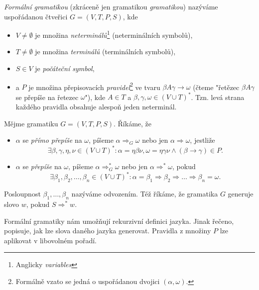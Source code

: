 \begin{definition}\label{def:formalni-gramatika}
    \emph{Formální gramatikou} (zkráceně jen gramatikou \emph{gramatikou}) nazýváme uspořádanou čtveřici $G=(V,T,P,S)$, kde
    \begin{itemize}
        \item $V\neq\emptyset$ je množina \emph{neterminálů}\footnote{Anglicky \emph{variables}} (neterminálních symbolů),
        \item $T\neq\emptyset$ je množina \emph{terminálů} (terminálních symbolů),
        \item $S\in V$ je \emph{počáteční symbol},
        \item a $P$ je množina přepisovacích \emph{pravidel}\footnote{Formálně vzato se jedná o uspořádanou dvojici $(\alpha,\omega)$.} ve tvaru $\beta A\gamma\to\omega$ (čteme "řetězec $\beta A\gamma$ se přepíše na řetezec $\omega$"), kde $A\in T$ a $\beta,\gamma,\omega\in(V\cup T)^*$. Tzn. levá strana každého pravidla obsahuje alespoň jeden neterminál.
    \end{itemize}
\end{definition}
\begin{definition}\label{def:odvozeni-slova-v-gramatice}
    Mějme gramatiku $G=(V,T,P,S)$. Říkáme, že
    \begin{itemize}
        \item $\alpha$ se \emph{přímo přepíše} na $\omega$, píšeme $\alpha\Rightarrow_G\omega$ nebo jen $\alpha\Rightarrow\omega$, jestliže
        \[\exists\beta,\gamma,\eta,\nu\in(V\cup T)^*: \alpha=\eta\beta\nu,\omega=\eta\gamma\nu\land(\beta\to\gamma)\in P.\]
        \item $\alpha$ se \emph{přepíše} na $\omega$, píšeme $\alpha\Rightarrow_G^*\omega$ nebo jen $\alpha\Rightarrow^*\omega$, pokud
        \[\exists\beta_1,\beta_2,\ldots,\beta_n\in(V\cup T)^*:\alpha=\beta_1\Rightarrow\beta_2\Rightarrow\dots\Rightarrow\beta_n=\omega.\]
    \end{itemize}
    Posloupnost $\beta_1,\ldots,\beta_n$ nazýváme odvozením. Též říkáme, že gramatika $G$ generuje slovo $w$, pokud $S\Rightarrow^* w$.
\end{definition}
Formální gramatiky nám umožňují rekurzivní definici jazyka. Jinak řečeno, popisuje, jak lze slova daného jazyka generovat. Pravidla z množiny $P$ lze aplikovat v libovolném pořadí.
